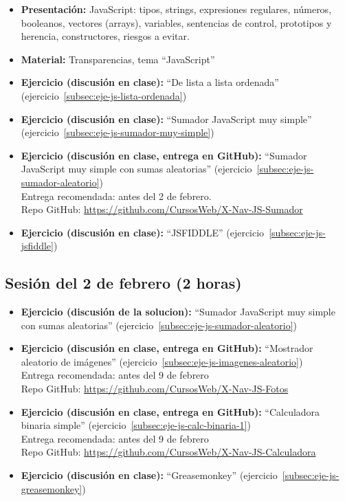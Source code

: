 \documentclass[a4paper,12pt]{report}
\begin{document}
\begin{itemize}
\item \textbf{Presentación:} JavaScript: tipos, strings, expresiones regulares, números, booleanos, vectores (arrays), variables, sentencias de control, prototipos y herencia, constructores, riesgos a evitar.
\item \textbf{Material:} Transparencias, tema ``JavaScript''
\item \textbf{Ejercicio (discusión en clase):} ``De lista a lista ordenada'' (ejercicio~\ref{subsec:eje-js-lista-ordenada})
\item \textbf{Ejercicio (discusión en clase):} ``Sumador JavaScript muy simple'' (ejercicio~\ref{subsec:eje-js-sumador-muy-simple})
\item \textbf{Ejercicio (discusión en clase, entrega en GitHub):} ``Sumador JavaScript muy simple con sumas aleatorias'' (ejercicio~\ref{subsec:eje-js-sumador-aleatorio}) \\
  Entrega recomendada: antes del 2 de febrero. \\
  Repo GitHub: \url{https://github.com/CursosWeb/X-Nav-JS-Sumador} \\
\item \textbf{Ejercicio (discusión en clase):} ``JSFIDDLE'' (ejercicio~\ref{subsec:eje-js-jsfiddle})
\end{itemize}


\subsection{Sesión del 2 de febrero (2 horas)}

\begin{itemize}
\item \textbf{Ejercicio (discusión de la solucion):} ``Sumador JavaScript muy simple con sumas aleatorias'' (ejercicio~\ref{subsec:eje-js-sumador-aleatorio})
\item \textbf{Ejercicio (discusión en clase, entrega en GitHub):} ``Mostrador aleatorio de imágenes'' (ejercicio~\ref{subsec:eje-js-imagenes-aleatorio}) \\
  Entrega recomendada: antes del 9 de febrero \\
  Repo GitHub: \url{https://github.com/CursosWeb/X-Nav-JS-Fotos} \\
\item \textbf{Ejercicio (discusión en clase, entrega en GitHub):} ``Calculadora binaria simple'' (ejercicio~\ref{subsec:eje-js-calc-binaria-1}) \\
  Entrega recomendada: antes del 9 de febrero \\
  Repo GitHub: \url{https://github.com/CursosWeb/X-Nav-JS-Calculadora} \\
\item \textbf{Ejercicio (discusión en clase):} ``Greasemonkey'' (ejercicio~\ref{subsec:eje-js-greasemonkey})
\end{itemize}
\end{document}
